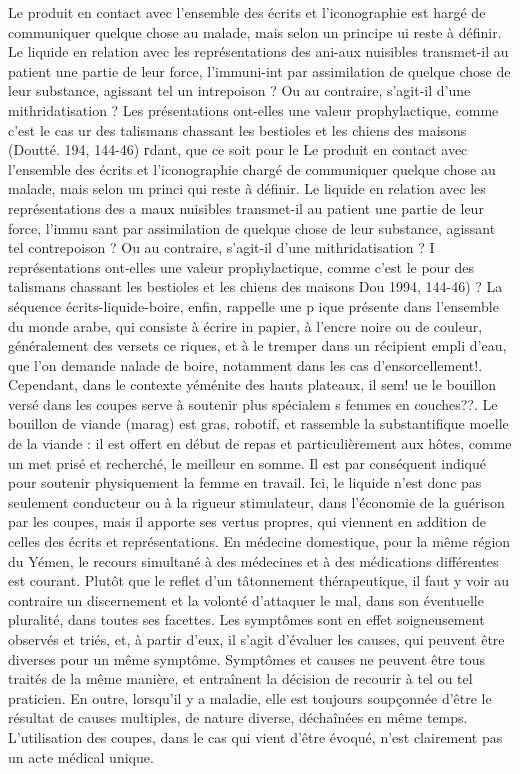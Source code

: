 Le produit en contact avec l'ensemble des écrits et l'iconographie est hargé de communiquer quelque chose au malade, mais selon un principe ui reste à définir. Le liquide en relation avec les représentations des ani-aux nuisibles transmet-il au patient une partie de leur force, l'immuni-int par assimilation de quelque chose de leur substance, agissant tel un intrepoison ? Ou au contraire, s'agit-il d'une mithridatisation ? Les présentations ont-elles une valeur prophylactique, comme c'est le cas ur des talismans chassant les bestioles et les chiens des maisons (Doutté.
194, 144-46) гdant, que ce soit pour le
Le produit en contact avec l'ensemble des écrits et l'iconographie chargé de communiquer quelque chose au malade, mais selon un princi qui reste à définir. Le liquide en relation avec les représentations des a maux nuisibles transmet-il au patient une partie de leur force, l'immu sant par assimilation de quelque chose de leur substance, agissant tel contrepoison ? Ou au contraire, s'agit-il d'une mithridatisation ? I représentations ont-elles une valeur prophylactique, comme c'est le pour des talismans chassant les bestioles et les chiens des maisons Dou 1994, 144-46) ? La séquence écrits-liquide-boire, enfin, rappelle une p ique présente dans l'ensemble du monde arabe, qui consiste à écrire in papier, à l'encre noire ou de couleur, généralement des versets ce riques, et à le tremper dans un récipient empli d'eau, que l'on demande nalade de boire, notamment dans les cas d'ensorcellement!.
Cependant, dans le contexte yéménite des hauts plateaux, il sem! ue le bouillon versé dans les coupes serve à soutenir plus spécialem s femmes en couches??. Le bouillon de viande (marag) est gras, robotif, et rassemble la substantifique moelle de la viande : il est offert en début de repas et particulièrement aux hôtes, comme un met prisé et recherché, le meilleur en somme. Il est par conséquent indiqué pour soutenir physiquement la femme en travail. Ici, le liquide n'est donc pas seulement conducteur ou à la rigueur stimulateur, dans l'économie de la guérison par les coupes, mais il apporte ses vertus propres, qui viennent en addition de celles des écrits et représentations. En médecine domestique, pour la même région du Yémen, le recours simultané à des médecines et à des médications différentes est courant. Plutôt que le reflet d'un tâtonnement thérapeutique, il faut y voir au contraire un discernement et la volonté d'attaquer le mal, dans son éventuelle pluralité, dans toutes ses facettes. Les symptômes sont en effet soigneusement observés et triés, et, à partir d'eux, il s'agit d'évaluer les causes, qui peuvent être diverses pour un même symptôme. Symptômes et causes ne peuvent être tous traités de la même manière, et entraînent la décision de recourir à tel ou tel praticien. En outre, lorsqu'il y a maladie, elle est toujours soupçonnée d'être le résultat de causes multiples, de nature diverse, déchaînées en même temps. L'utilisation des coupes, dans le cas qui vient d'être évoqué, n'est clairement pas un acte médical unique.
